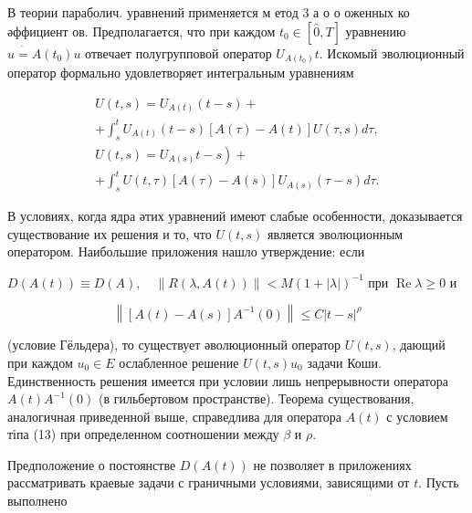 \documentclass[10pt]{article}
\begin{document}
В теории параболич. уравнений применяется м етод 3 а о о оженных ко әффициент ов. Предполагается, что при каждом $t_{0} \in[\hat{0}, T]$ уравнению $\dot{u=A}\left(t_{0}\right) u$ отвечает полугрупповой оператор $U_{A\left(t_{0}\right)} t$. Искомый эволюционный оператор формально удовлетворяет интегральным уравнениям



\[

\begin{gathered}

U(t, s)=U_{A(t)}(t-s)+ \\

+\int_{s}^{t} U_{A(t)}(t-s)[A(\tau)-A(t)] U(\tau, s) d \tau, \\

\left.U(t, s)=U_{A(s)} t-s\right)+ \\

+\int_{s}^{t} U(t, \tau)[A(\tau)-A(s)] U_{A(s)}(\tau-s) d \tau .

\end{gathered}

\]



В условиях, когда ядра әтих уравнений имеют слабые особенности, доказывается существование их решения и то, что $U(t, s)$ является эволюционным оператором. Наибольшие приложения нашло утверждение: если



$D(A(t)) \equiv D(A), \quad\|R(\lambda, A(t))\|<M(1+|\lambda|)^{-1}$ при $\operatorname{Re} \lambda \geqslant 0$ и



\[

\left\|[A(t)-A(s)] A^{-1}(0)\right\| \leqslant C|t-s|^{\rho}

\]



(условие Гёльдера), то существует әволюционный оператор $U(t, s)$, дающий при каждом $u_{0} \in E$ ослабленное решение $U(t, s) u_{0}$ задачи Коши. Единственность решения имеется при условии лишь непрерывности оператора $A(t) A^{-1}(0)$ (в гильбертовом пространстве). Теорема существования, аналогичная приведенной выше, справедлива для оператора $A(t)$ с условием тіпа (13) при определенном соотношении между $\beta$ и $\rho$.



Предположение о постоянстве $D(A(t))$ не позволяет в приложениях рассматривать краевые задачи с граничными условиями, зависящими от $t$. Пусть выполнено
\end{document}

